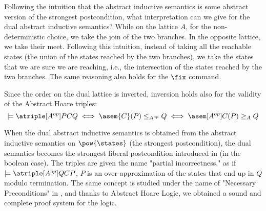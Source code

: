 Following the intuition that the abstract inductive semantics is some abstract
version of the strongest postcondition, what interpretation can we give for the
dual abstract inductive semantics? While on the lattice $A$, for the
non-deterministic choice, we take the join of the two branches. In the opposite
lattice, we take their meet. Following this intuition, instead of taking all
the reachable states (the union of the states reached by the two branches), we
take the states that we are sure we are reaching, i.e., the intersection of the
states reached by the two branches. The same reasoning also holds for the
$\fix$ command.

Since the order on the dual lattice is inverted, inversion holds also for the
validity of the Abstract Hoare triples: $$\models \atriple[A^{op}]{P}{C}{Q}
\iff \asem{C}(P) \leq_{A^{op}} Q \iff \asem[A^{op}]{C}(P) \geq_A Q$$

When the dual abstract inductive semantics is obtained from the abstract
inductive semantics on $\pow{\states}$ (the strongest postcondition), the dual
semantics becomes the strongest liberal postcondition introduced in
\cite{Zhang22} (in the boolean case). The triples are given the name "partial
incorrectness," as if $\models \atriple[A^{op}]{Q}{C}{P}$, $P$ is an
over-approximation of the states that end up in $Q$ modulo termination. The
same concept is studied under the name of "Necessary Preconditions" in
\cite{Cousot13}, and thanks to Abstract Hoare Logic, we obtained a sound and
complete proof system for the logic.

